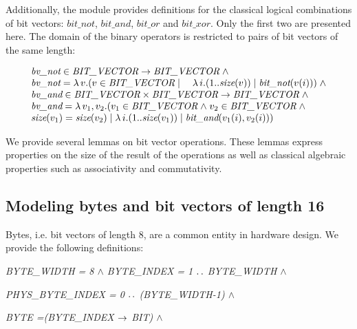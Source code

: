 \documentclass[a4paper]{llncs}
\begin{document}
Additionally, the module provides definitions for the classical
logical combinations of bit vectors: $\textit{bit\_not}$,
$\textit{bit\_and}$, $\textit{bit\_or}$ and $\textit{bit\_xor}$. Only
the first two are presented here. The domain of the binary operators
is restricted to pairs of bit vectors of the same length:

\begin{flushleft}
$$
\begin{array}{l}
\textit{bv\_not} \in \textit{BIT\_VECTOR} \fun \textit{BIT\_VECTOR} \land \\
\textit{bv\_not} = \lambda v . (v \in \textit{BIT\_VECTOR} \mid \quad \lambda i . (1 .. \textit{size}(v)) \mid \textit{bit\_not}(v(i))) \land \\
\textit{bv\_and} \in \textit{BIT\_VECTOR} \times \textit{BIT\_VECTOR} \fun \textit{BIT\_VECTOR} \land \\
\textit{bv\_and} = \lambda v_1, v_2 . (v_1 \in \textit{BIT\_VECTOR} \land v_2 \in \textit{BIT\_VECTOR} \land \\
\textit{size}(v_1) = \textit{size}(v_2) \mid \lambda i . (1 .. \textit{size}(v_1)) \mid
\textit{bit\_and}(v_1(i), v_2(i)))
\end{array}
$$
\end{flushleft}

We provide several lemmas on bit vector operations. These lemmas
express properties on the size of the result of the operations
as well as classical algebraic properties such as associativity
and commutativity.

\subsection{Modeling bytes and bit vectors of length 16}
\label{subsec:HardwareLibrary3}

Bytes, i.e. bit vectors of length 8, are a common entity in hardware
design. We provide the following definitions:

\hspace*{0.0in}\it BYTE\_WIDTH \rm = 8 $\land$ \it BYTE\_INDEX \rm = 1 $\mathbin{\ldotp\ldotp}$ \rm  BYTE\_WIDTH\rm  \hspace*{0.03in} $\land$

\hspace*{0.0in}\it PHYS\_BYTE\_INDEX \rm = \rm 0 $\mathbin{\ldotp\ldotp}$ \rm (\it BYTE\_WIDTH\rm -\rm 1\rm )\hspace*{0.03in} $\land$

\hspace*{0.0in}\it BYTE \rm =\rm (\it BYTE\_INDEX  $\rightarrow$  \it BIT\rm )\hspace*{0.0in} $\land$  
\end{document}
